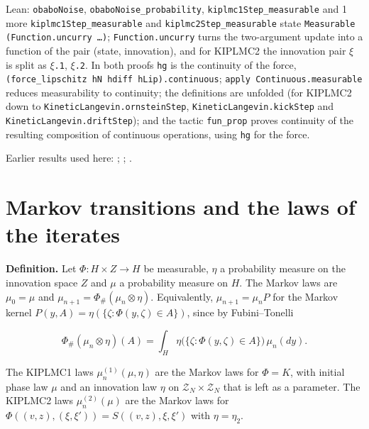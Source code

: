 \documentclass[11pt,a4paper]{article}
\begin{document}
\begin{leanbox}{Lean: \texttt{obaboNoise}, \texttt{obaboNoise\_\allowbreak{}probability}, \texttt{kiplmc1Step\_\allowbreak{}measurable} and 1 more}
\texttt{kiplmc1\allowbreak{}Step\_\allowbreak{}measurable} and \texttt{kiplmc2\allowbreak{}Step\_\allowbreak{}measurable} state \texttt{Measurable (Function.\allowbreak{}uncurry …)}; \texttt{Function.\allowbreak{}uncurry} turns the two-argument update into a function of the pair (state, innovation), and for KIPLMC2 the innovation pair \texttt{\ensuremath{\xi}} is split as \texttt{\ensuremath{\xi}.\allowbreak{}1}, \texttt{\ensuremath{\xi}.\allowbreak{}2}. In both proofs \texttt{hg} is the continuity of the force, \texttt{(force\_\allowbreak{}lipschitz h\allowbreak{}N hdiff h\allowbreak{}Lip).\allowbreak{}continuous}; \texttt{apply Continuous.\allowbreak{}measurable} reduces measurability to continuity; the definitions are unfolded (for KIPLMC2 down to \texttt{Kinetic\allowbreak{}Langevin.\allowbreak{}ornstein\allowbreak{}Step}, \texttt{Kinetic\allowbreak{}Langevin.\allowbreak{}kick\allowbreak{}Step} and \texttt{Kinetic\allowbreak{}Langevin.\allowbreak{}drift\allowbreak{}Step}); and the tactic \texttt{fun\_\allowbreak{}prop} proves continuity of the resulting composition of continuous operations, using \texttt{hg} for the force.
\end{leanbox}


Earlier results used here: \cite[Section~3.1.1]{LangevinLean2026IPLA}; \cite[Section~3.12.2]{LangevinLean2026Kinetic}; \cite[Section~3.20.1]{LangevinLean2026Kinetic}.

\section{\texorpdfstring{Markov transitions and the laws of the iterates}{Markov transitions and the laws of the iterates}}


\textbf{Definition.} Let \(\Phi:H\times Z\to H\) be measurable, \(\eta\) a probability measure on the innovation space \(Z\) and \(\mu\) a probability measure on \(H\). The Markov laws are \(\mu_0=\mu\) and \(\mu_{n+1}=\Phi_\#(\mu_n\otimes\eta)\). Equivalently, \(\mu_{n+1}=\mu_nP\) for the Markov kernel \(P(y,A)=\eta(\{\zeta:\Phi(y,\zeta)\in A\})\), since by Fubini–Tonelli


\[\Phi_\#(\mu_n\otimes\eta)(A)=\int_H\eta\bigl(\{\zeta:\Phi(y,\zeta)\in A\}\bigr)\,\mu_n(dy).\]


The KIPLMC1 laws \(\mu^{(1)}_n(\mu,\eta)\) are the Markov laws for \(\Phi=K\), with initial phase law \(\mu\) and an innovation law \(\eta\) on \(\mathcal Z_N\times\mathcal Z_N\) that is left as a parameter. The KIPLMC2 laws \(\mu^{(2)}_n(\mu)\) are the Markov laws for \(\Phi((v,z),(\xi,\xi'))=S((v,z),\xi,\xi')\) with \(\eta=\eta_2\).
\end{document}
